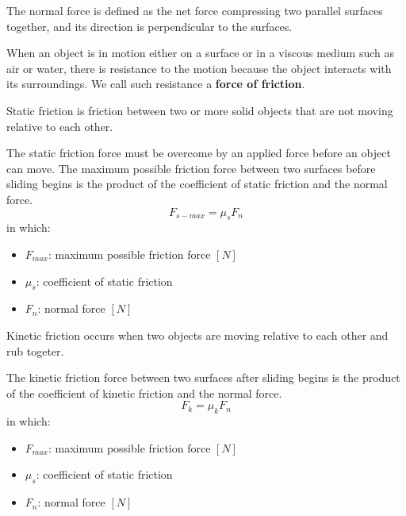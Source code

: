             \par The normal force is defined as the net force compressing two parallel surfaces
            together, and its direction is perpendicular to the surfaces.
            \par When an object is in motion either on a surface or in a viscous medium such as air
            or water, there is resistance to the motion because the object interacts with its
            surroundings. We call such resistance a \textbf{force of friction}.
            \par Static friction is friction between two or more solid objects that are not
            moving relative to each other.
            \par The static friction force must be overcome by an applied force before an object
            can move. The maximum possible friction force between two surfaces before sliding
            begins is the product of the coefficient of static friction and the normal force.
            \begin{equation}
                F_{s-max} = \mu_{s} F_{n}
            \end{equation}
            in which:
            \begin{itemize}
                \item $F_{max}$: maximum possible friction force $[N]$
                \item $\mu_{s}$: coefficient of static friction
                \item $F_{n}$: normal force $[N]$
            \end{itemize}
            \par Kinetic friction occurs when two objects are moving relative to each other and rub
            togeter.
            \par The kinetic friction force between two surfaces after sliding begins is the product
            of the coefficient of kinetic friction and the normal force.
            \begin{equation}
                F_{k} = \mu_{k} F_{n}
            \end{equation}
            in which:
            \begin{itemize}
                \item $F_{max}$: maximum possible friction force $[N]$
                \item $\mu_{s}$: coefficient of static friction
                \item $F_{n}$: normal force $[N]$
            \end{itemize}

\pagebreak
